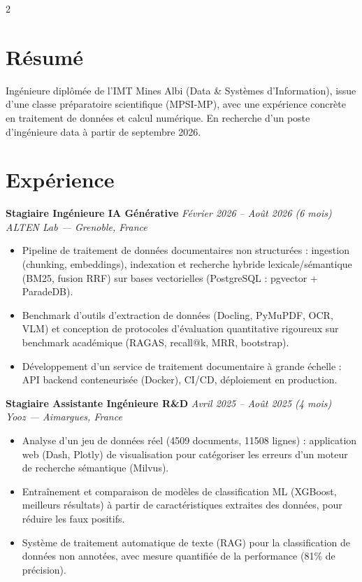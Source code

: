 \documentclass[10.5pt,a4paper]{article}
\newcommand{\sectionrule}{\vspace{-6pt}{\color{accent}\hrule height 1pt}\vspace{2pt}}
\newcommand{\cvexp}[5]{%
  \noindent\textbf{#1} \hfill {\itshape\color{graytext}\small #4}\\
  {\itshape #2 --- #3}\\[-2pt]
  #5
  \vspace{5pt}
}
\begin{document}
\setlength{\columnsep}{1.5em}
\begin{paracol}{2}

\section*{Résumé}
\sectionrule
\justifying
Ingénieure diplômée de l'IMT Mines Albi (Data \& Systèmes d'Information), issue d'une classe préparatoire scientifique (MPSI-MP), avec une expérience concrète en traitement de données et calcul numérique. En recherche d'un poste d'ingénieure data à partir de septembre 2026.

\section*{Expérience}
\sectionrule

\cvexp{Stagiaire Ingénieure IA Générative}{ALTEN Lab}{Grenoble, France}{Février 2026 -- Août 2026 (6 mois)}{%
  \begin{itemize}[leftmargin=12pt, itemsep=2pt, topsep=0pt, partopsep=0pt, parsep=0pt]
    \item Pipeline de traitement de données documentaires non structurées : ingestion (chunking, embeddings), indexation et recherche hybride lexicale/sémantique (BM25, fusion RRF) sur bases vectorielles (PostgreSQL : pgvector + ParadeDB).
    \item Benchmark d'outils d'extraction de données (Docling, PyMuPDF, OCR, VLM) et conception de protocoles d'évaluation quantitative rigoureux sur benchmark académique (RAGAS, recall@k, MRR, bootstrap).
    \item Développement d'un service de traitement documentaire à grande échelle : API backend conteneurisée (Docker), CI/CD, déploiement en production.
  \end{itemize}
}

\cvexp{Stagiaire Assistante Ingénieure R\&D}{Yooz}{Aimargues, France}{Avril 2025 -- Août 2025 (4 mois)}{%
  \begin{itemize}[leftmargin=12pt, itemsep=2pt, topsep=0pt, partopsep=0pt, parsep=0pt]
    \item Analyse d'un jeu de données réel (4509 documents, 11508 lignes) : application web (Dash, Plotly) de visualisation pour catégoriser les erreurs d'un moteur de recherche sémantique (Milvus).
    \item Entraînement et comparaison de modèles de classification ML (XGBoost, meilleurs résultats) à partir de caractéristiques extraites des données, pour réduire les faux positifs.
    \item Système de traitement automatique de texte (RAG) pour la classification de données non annotées, avec mesure quantifiée de la performance (81\% de précision).
  \end{itemize}
}


\end{paracol}
\end{document}
